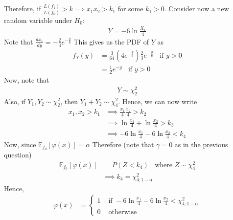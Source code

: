 \documentclass[a4paper]{article}
\begin{document}
Therefore, if $\frac{L\left( f_1 \right) }{L\left( f_0 \right) }>k \implies x_1x_2 > k_1$ for some $k_1 > 0$.
\newline\newline
Consider now a new random variable under $H_0$:
\begin{equation*}
	\begin{split}
		Y = -6\ln \frac{X_1}{4}
	\end{split}
\end{equation*}
Note that $\frac{dx_1}{dy} = -\frac{2}{3}e^{-\frac{y}{6}}$
\newline\newline
This gives us the PDF of $Y$ as 
 \begin{equation*}
	\begin{split}
		f_Y\left( y \right) &= \frac{3}{64}\left( 4e^{-\frac{y}{6}} \right) \frac{2}{3}e^{-\frac{y}{6}} \;\;\text{ if } y>0\\
		&= \frac{1}{2} e^{-y} \;\;\text{ if } y>0
	\end{split}
\end{equation*}
Now, note that
\begin{equation*}
	\begin{split}
		Y \sim \chi^2_2
	\end{split}
\end{equation*}
Also, if $Y_1,Y_2 \sim \chi^2_2$, then $Y_1+Y_2 \sim \chi^2_4$.
\newline\newline
Hence, we can now write
\begin{equation*}
	\begin{split}
		x_1,x_2 > k_1 & \implies \frac{x_1}{4}\frac{x_2}{4}>k_2\\
		&\implies \ln \frac{x_1}{4} + \ln \frac{x_2}{4} > k_3\\
		&\implies -6\ln \frac{x_1}{4} -6\ln \frac{x_2}{4} < k_4
	\end{split}
\end{equation*}
Now, since $\mathbb{E}_{f_0}\left[ \varphi\left( x \right)  \right] = \alpha $
Therefore (note that $\gamma = 0$ as in the previous question)
\begin{equation*}
	\begin{split}
		\mathbb{E}_{f_0} \left[ \varphi\left(  x\right)  \right] &=  P\left( Z< k_4	\right) \;\;\text{ where $Z \sim \chi^2_4$} \\
		&\implies k_4 = \chi^2_{4;1-\alpha}
	\end{split}
\end{equation*}
Hence,
\begin{equation*}
	\begin{split}
		\varphi\left( x \right) &= \begin{cases}
			1 & \text{ if } -6\ln \frac{x_1}{4} - 6\ln \frac{x_2}{4} < \chi^2_{4;1-\alpha}\\
			0 & \text{ otherwise}
		\end{cases}
	\end{split}
\end{equation*}
\end{document}

